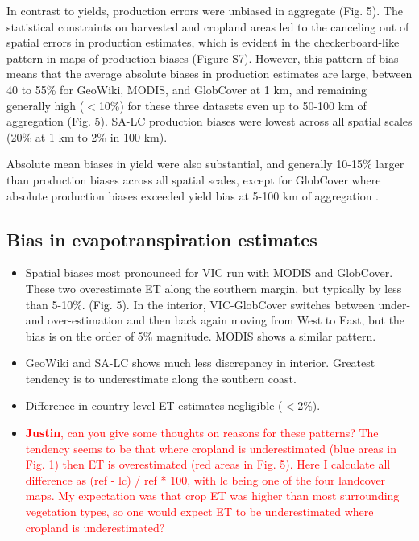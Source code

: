 \documentclass{pnastwo}
\begin{document}
\begin{article}
In contrast to yields, production errors were unbiased in aggregate (Fig. 5). The statistical constraints on harvested and cropland areas led to the canceling out of spatial errors in production estimates, which is evident in the checkerboard-like pattern in maps of production biases (Figure S7). However, this pattern of bias means that the average absolute biases in  production estimates are large, between 40 to 55\% for GeoWiki, MODIS, and GlobCover at 1 km, and remaining generally high ($<$10\%) for these three datasets even up to 50-100 km of aggregation (Fig. 5). SA-LC production biases were lowest across all spatial scales (20\% at 1 km to 2\% in 100 km).  

Absolute mean biases in yield were also substantial, and generally 10-15\% larger than production biases across all spatial scales, except for GlobCover where absolute production biases exceeded yield bias at 5-100 km of aggregation . 

\subsection{Bias in evapotranspiration estimates}
\begin{itemize}
 \item Spatial biases most pronounced for VIC run with MODIS and GlobCover. These two overestimate ET along the southern margin, but typically by less than 5-10\%. (Fig. 5).  In the interior, VIC-GlobCover switches between under-  and over-estimation and then back again moving from West to East, but the bias is on the order of 5\% magnitude.  MODIS shows a similar pattern.    
 \item GeoWiki and SA-LC shows much less discrepancy in interior. Greatest tendency is to underestimate along the southern coast. 
 \item Difference in country-level ET estimates negligible ($<$2\%).
 \item \textcolor{red}{\textbf{Justin}, can you give some thoughts on reasons for these patterns? The tendency seems to be that where cropland is underestimated (blue areas in Fig. 1) then ET is overestimated (red areas in Fig. 5). Here I calculate all difference as (ref - lc) / ref * 100, with lc being one of the four landcover maps. My expectation was that crop ET was higher than most surrounding vegetation types, so one would expect ET to be underestimated where cropland is underestimated?}
\end{itemize}


\end{article}
\end{document}
